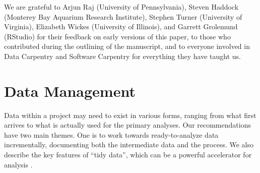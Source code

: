 \documentclass[10pt,letterpaper]{article}
\newcommand{\practicesection}[2]{\section{#1}\label{#2}}
\begin{document}
We are grateful to Arjun Raj (University of Pennsylvania), Steven
Haddock (Monterey Bay Aquarium Research Institute), Stephen Turner
(University of Virginia), Elizabeth Wickes (University of Illinois),
and Garrett Grolemund (RStudio) for their feedback on early versions
of this paper, to those who contributed during the outlining of the
manuscript, and to everyone involved in Data Carpentry and Software
Carpentry for everything they have taught us.

\practicesection{Data Management}{sec:data}

Data within a project may need to exist in various forms, ranging from
what first arrives to what is actually used for the primary analyses.
Our recommendations have two main themes. One is to work towards
ready-to-analyze data incrementally, documenting both the intermediate
data and the process. We also describe the key features of ``tidy
data'', which can be a powerful accelerator for analysis
\cite{wickham2014,hart2016}.
\end{document}
